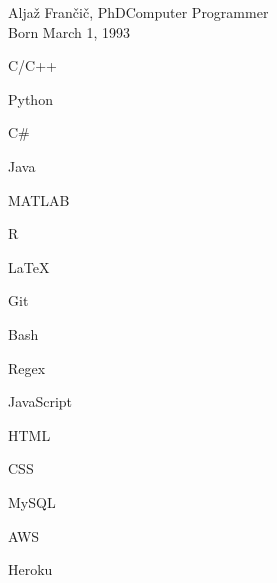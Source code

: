 \documentclass{article}
\begin{document}
\begin{cv}[avatar]{Aljaž Frančič, PhD}{Computer Programmer\\\small{Born March 1, 1993}}

\begin{cvitem}
    C/C++
\end{cvitem}

\begin{cvitem}
    Python
\end{cvitem}

\begin{cvitem}
    C\#
\end{cvitem}

\begin{cvitem}
    Java
\end{cvitem}

\begin{cvitem}
    MATLAB
\end{cvitem}

\begin{cvitem}
    R
\end{cvitem}

\begin{cvitem}
    LaTeX
\end{cvitem}

\begin{cvitem}
    Git
\end{cvitem}

\begin{cvitem}
    Bash
\end{cvitem}

\begin{cvitem}
    Regex
\end{cvitem}

\begin{cvitem}
    JavaScript
\end{cvitem}

\begin{cvitem}
    HTML
\end{cvitem}

\begin{cvitem}
    CSS
\end{cvitem}

\begin{cvitem}
    MySQL
\end{cvitem}

\begin{cvitem}
    AWS
\end{cvitem}

\begin{cvitem}
    Heroku
\end{cvitem}


\end{cv}
\end{document}
